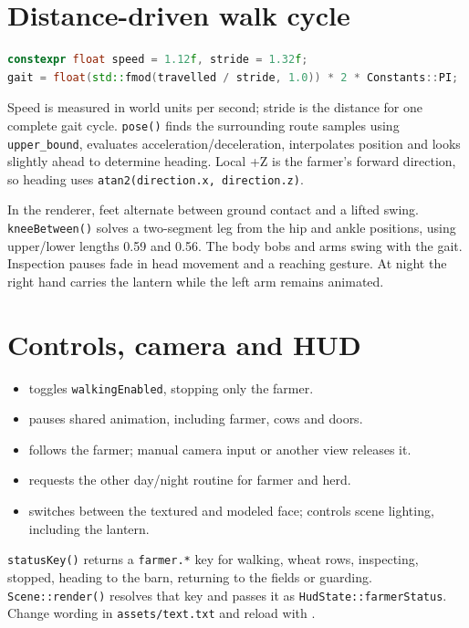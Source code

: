 \documentclass[11pt,a4paper,openany]{book}
\newcommand{\code}[1]{\texttt{#1}}
\newcommand{\file}[1]{\nolinkurl{#1}}
\newcommand{\keycap}[1]{\begingroup\setlength{\fboxsep}{0.8pt}\raisebox{0.05ex}{\fbox{\footnotesize\texttt{#1}}}\endgroup}
\begin{document}
\section{Distance-driven walk cycle}
\begin{lstlisting}[language=C++]
constexpr float speed = 1.12f, stride = 1.32f;
gait = float(std::fmod(travelled / stride, 1.0)) * 2 * Constants::PI;
\end{lstlisting}

Speed is measured in world units per second; stride is the distance for one complete gait cycle. \code{pose()} finds the surrounding route samples using \code{upper_bound}, evaluates acceleration/deceleration, interpolates position and looks slightly ahead to determine heading. Local +Z is the farmer's forward direction, so heading uses \code{atan2(direction.x, direction.z)}.

In the renderer, feet alternate between ground contact and a lifted swing. \code{kneeBetween()} solves a two-segment leg from the hip and ankle positions, using upper/lower lengths 0.59 and 0.56. The body bobs and arms swing with the gait. Inspection pauses fade in head movement and a reaching gesture. At night the right hand carries the lantern while the left arm remains animated.

\section{Controls, camera and HUD}
\begin{itemize}
	\item \keycap{U} toggles \code{walkingEnabled}, stopping only the farmer.
	\item \keycap{P} pauses shared animation, including farmer, cows and doors.
	\item \keycap{J} follows the farmer; manual camera input or another view releases it.
	\item \keycap{N} requests the other day/night routine for farmer and herd.
	\item \keycap{T} switches between the textured and modeled face; \keycap{L} controls scene lighting, including the lantern.
\end{itemize}

\code{statusKey()} returns a \code{farmer.*} key for walking, wheat rows, inspecting, stopped, heading to the barn, returning to the fields or guarding. \code{Scene::render()} resolves that key and passes it as \code{HudState::farmerStatus}. Change wording in \file{assets/text.txt} and reload with \keycap{F9}.
\end{document}
